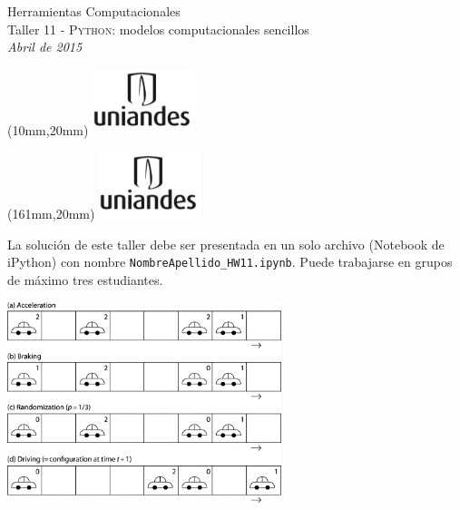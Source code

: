 \documentclass[11pt,letterpaper]{exam}
\begin{document}
\begin{center}
{\Large Herramientas Computacionales} \\
Taller 11 - \textsc{Python}: modelos computacionales sencillos \\
{\small \it Abril de 2015}
\end{center}

\begin{textblock*}{40mm}(10mm,20mm)
  \includegraphics[width=3cm]{logoUniandes.png}
\end{textblock*}

\begin{textblock*}{40mm}(161mm,20mm)
  \includegraphics[width=3cm]{logoUniandes.png}
\end{textblock*}

\vspace{1cm}

La solución de este taller debe ser presentada en un solo archivo (Notebook de iPython) con nombre \verb+NombreApellido_HW11.ipynb+. Puede trabajarse en grupos de máximo tres estudiantes.

\begin{center}
	\includegraphics[width=0.6\textwidth]{ejemplo.png}
\end{center}
\end{document}
